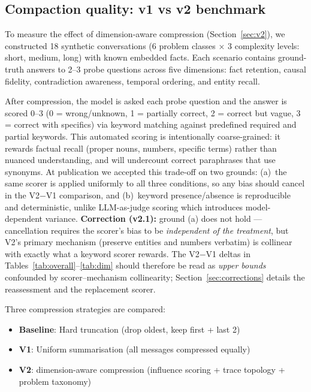 \documentclass[11pt,a4paper]{article}
\begin{document}
\subsection{Compaction quality: v1 vs v2 benchmark}

To measure the effect of dimension-aware compression (Section~\ref{sec:v2}), we constructed 18 synthetic conversations (6 problem classes $\times$ 3 complexity levels: short, medium, long) with known embedded facts. Each scenario contains ground-truth answers to 2--3 probe questions across five dimensions: fact retention, causal fidelity, contradiction awareness, temporal ordering, and entity recall.

After compression, the model is asked each probe question and the answer is scored 0--3 (0 = wrong/unknown, 1 = partially correct, 2 = correct but vague, 3 = correct with specifics) via keyword matching against predefined required and partial keywords. This automated scoring is intentionally coarse-grained: it rewards factual recall (proper nouns, numbers, specific terms) rather than nuanced understanding, and will undercount correct paraphrases that use synonyms. At publication we accepted this trade-off on two grounds: (a)~the same scorer is applied uniformly to all three conditions, so any bias should cancel in the V2$-$V1 comparison, and (b)~keyword presence/absence is reproducible and deterministic, unlike LLM-as-judge scoring which introduces model-dependent variance. \textbf{Correction (v2.1):} ground (a) does not hold --- cancellation requires the scorer's bias to be \emph{independent of the treatment}, but V2's primary mechanism (preserve entities and numbers verbatim) is collinear with exactly what a keyword scorer rewards. The V2$-$V1 deltas in Tables~\ref{tab:overall}--\ref{tab:dim} should therefore be read as \emph{upper bounds} confounded by scorer--mechanism collinearity; Section~\ref{sec:corrections} details the reassessment and the replacement scorer.

Three compression strategies are compared:

\begin{itemize}[nosep]
  \item \textbf{Baseline}: Hard truncation (drop oldest, keep first + last 2)
  \item \textbf{V1}: Uniform summarisation (all messages compressed equally)
  \item \textbf{V2}: dimension-aware compression (influence scoring + trace topology + problem taxonomy)
\end{itemize}
\end{document}
